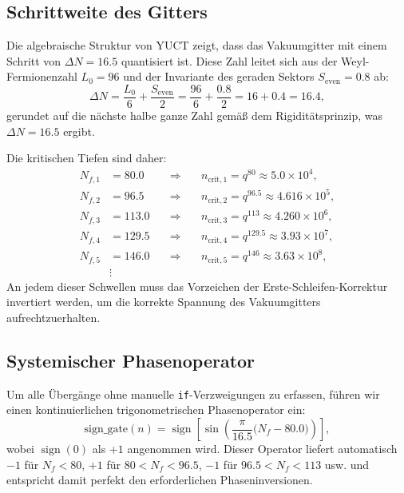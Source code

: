 \documentclass[11pt,a4paper]{article}
\newcommand{\Seven}{S_{\mathrm{even}}}
\begin{document}
	\subsection{Schrittweite des Gitters}
	Die algebraische Struktur von YUCT zeigt, dass das Vakuumgitter mit einem Schritt von \(\Delta N = 16.5\) quantisiert ist. Diese Zahl leitet sich aus der Weyl-Fermionenzahl \(L_0 = 96\) und der Invariante des geraden Sektors \(\Seven = 0.8\) ab:
	\[
	\Delta N = \frac{L_0}{6} + \frac{\Seven}{2} = \frac{96}{6} + \frac{0.8}{2} = 16 + 0.4 = 16.4,
	\]
	gerundet auf die nächste halbe ganze Zahl gemäß dem Rigiditätsprinzip, was \(\Delta N = 16.5\) ergibt.
	
	Die kritischen Tiefen sind daher:
	\begin{align}
		N_{f,1} &= 80.0 \quad &\Longrightarrow&\quad n_{\mathrm{crit},1} = q^{80} \approx 5.0\times10^4, \\
		N_{f,2} &= 96.5 \quad &\Longrightarrow&\quad n_{\mathrm{crit},2} = q^{96.5} \approx 4.616\times10^5, \\
		N_{f,3} &= 113.0 \quad &\Longrightarrow&\quad n_{\mathrm{crit},3} = q^{113} \approx 4.260\times10^6, \\
		N_{f,4} &= 129.5 \quad &\Longrightarrow&\quad n_{\mathrm{crit},4} = q^{129.5} \approx 3.93\times10^7, \\
		N_{f,5} &= 146.0 \quad &\Longrightarrow&\quad n_{\mathrm{crit},5} = q^{146} \approx 3.63\times10^8, \\
		&\vdots & &
	\end{align}
	An jedem dieser Schwellen muss das Vorzeichen der Erste-Schleifen-Korrektur invertiert werden, um die korrekte Spannung des Vakuumgitters aufrechtzuerhalten.
	
	\subsection{Systemischer Phasenoperator}
	Um alle Übergänge ohne manuelle \texttt{if}-Verzweigungen zu erfassen, führen wir einen kontinuierlichen trigonometrischen Phasenoperator ein:
	\begin{equation}
		\boxed{\mathrm{sign\_gate}(n) = \operatorname{sign}\!\left[\sin\!\left(\frac{\pi}{16.5}\bigl(N_f - 80.0\bigr)\right)\right]},
		\label{eq:phaseoperator}
	\end{equation}
	wobei \(\operatorname{sign}(0)\) als \(+1\) angenommen wird. Dieser Operator liefert automatisch \(-1\) für \(N_f<80\), \(+1\) für \(80 < N_f < 96.5\), \(-1\) für \(96.5 < N_f < 113\) usw. und entspricht damit perfekt den erforderlichen Phaseninversionen.
	
\end{document}
